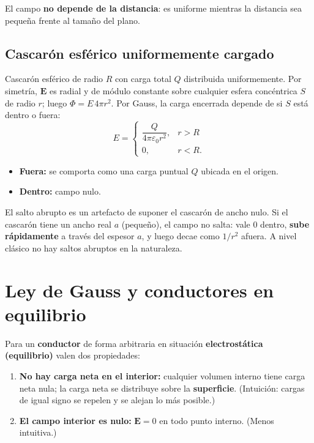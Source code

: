 \documentclass[12pt,a4paper]{article}
\begin{document}
El campo \textbf{no depende de la distancia}: es uniforme mientras la
distancia sea pequeña frente al tamaño del plano.

\subsection{Cascarón esférico uniformemente cargado}

Cascarón esférico de radio $R$ con carga total $Q$ distribuida
uniformemente. Por simetría, $\mathbf{E}$ es radial y de módulo
constante sobre cualquier esfera concéntrica $S$ de radio $r$; luego
$\Phi = E\, 4\pi r^{2}$. Por Gauss, la carga encerrada depende de si
$S$ está dentro o fuera:
\[
\boxed{E =
\begin{cases}
\dfrac{Q}{4\pi\varepsilon_0 r^{2}}, & r > R \\[2mm]
0, & r < R .
\end{cases}}
\]

\begin{itemize}[nosep]
  \item \textbf{Fuera:} se comporta como una carga puntual $Q$ ubicada
        en el origen.
  \item \textbf{Dentro:} campo nulo.
\end{itemize}

\begin{warnbox}[Discontinuidad en $r = R$]
  El salto abrupto es un artefacto de suponer el cascarón de ancho
  nulo. Si el cascarón tiene un ancho real $a$ (pequeño), el campo no
  salta: vale $0$ dentro, \textbf{sube rápidamente} a través del
  espesor $a$, y luego decae como $1/r^{2}$ afuera. A nivel clásico no
  hay saltos abruptos en la naturaleza.
\end{warnbox}

\section{Ley de Gauss y conductores en equilibrio}

Para un \textbf{conductor} de forma arbitraria en situación
\textbf{electrostática (equilibrio)} valen dos propiedades:

\begin{enumerate}[nosep]
  \item \textbf{No hay carga neta en el interior:} cualquier volumen
        interno tiene carga neta nula; la carga neta se distribuye
        sobre la \textbf{superficie}. (Intuición: cargas de igual signo
        se repelen y se alejan lo más posible.)
  \item \textbf{El campo interior es nulo:} $\mathbf{E} = 0$ en todo
        punto interno. (Menos intuitiva.)
\end{enumerate}
\end{document}
